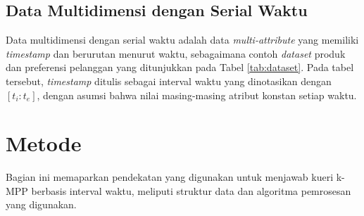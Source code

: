 \documentclass[conference]{IEEEtran}
\begin{document}
\subsection{Data Multidimensi dengan Serial Waktu}
Data multidimensi dengan serial waktu adalah data \textit{multi-attribute} yang memiliki \textit{timestamp} dan berurutan menurut waktu, sebagaimana contoh \textit{dataset} produk dan preferensi pelanggan yang ditunjukkan pada Tabel \ref{tab:dataset}. Pada tabel tersebut, \textit{timestamp} ditulis sebagai interval waktu yang dinotasikan dengan $[t_i:t_e]$, dengan asumsi bahwa nilai masing-masing atribut konstan setiap waktu. 

\section{Metode}
Bagian ini memaparkan pendekatan yang digunakan untuk menjawab kueri k-MPP berbasis interval waktu, meliputi struktur data dan algoritma pemrosesan yang digunakan.
\end{document}
